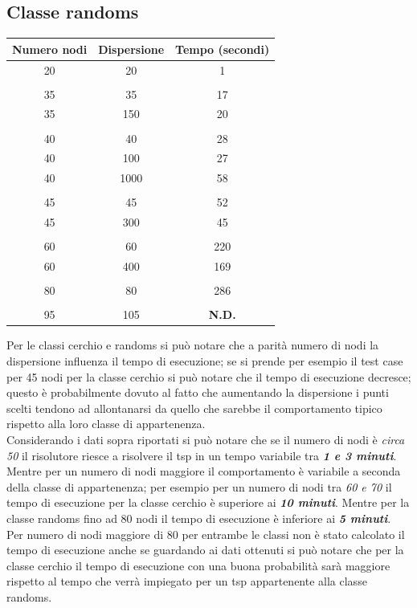 \documentclass{article}
\begin{document}
\subsection{Classe randoms}
\begin{table}[h]
\centering
\begin{tabular}{c | c | c}
\hline \hline
\textbf{Numero nodi} & \textbf{Dispersione} & \textbf{Tempo (secondi)} \\
\hline
20 & 20 & 1 \\ \\
\hline
\hline
35 & 35 & 17 \\
\hline
35 & 150 & 20 \\ \\
\hline
\hline
40 & 40 & 28 \\
\hline
40 & 100 & 27 \\
\hline
40 & 1000 & 58 \\ \\
\hline
\hline
45 & 45 & 52 \\
\hline
45 & 300 & 45 \\ \\
\hline
\hline
60 & 60 & 220 \\
\hline
60 & 400 & 169 \\ \\
\hline
\hline
80 & 80 & 286 \\ \\
\hline
\hline
95 & 105 & \textbf{N.D.} \\
\hline
\end{tabular}
\end{table}

Per le classi cerchio e randoms si può notare che a parità numero di nodi la dispersione influenza il tempo di esecuzione; se si prende per esempio il test case per 45 nodi per la classe cerchio si può notare che il tempo di esecuzione decresce; questo è probabilmente dovuto al fatto che aumentando la dispersione i punti scelti tendono ad allontanarsi da quello che sarebbe il comportamento tipico rispetto alla loro classe di appartenenza.
\\
Considerando i dati sopra riportati si può notare che se il numero di nodi è \textit{circa 50} il risolutore riesce a risolvere il tsp in un tempo variabile tra \textit{\textbf{1 e 3 minuti}}.
Mentre per un numero di nodi maggiore il comportamento è variabile a seconda della classe di appartenenza; per esempio per un numero di nodi tra \textit{60 e 70} il tempo di esecuzione per la classe cerchio è superiore ai \textit{\textbf{10 minuti}}. Mentre per la classe randoms fino ad 80 nodi il tempo di esecuzione è inferiore ai \textit{\textbf{5 minuti}}. \\
Per numero di nodi maggiore di 80 per entrambe le classi non è stato calcolato il tempo di esecuzione anche se guardando ai dati ottenuti si può notare che per la classe cerchio il tempo di esecuzione con una buona probabilità sarà maggiore rispetto al tempo che verrà impiegato per un tsp appartenente alla classe randoms. 
\end{document}

